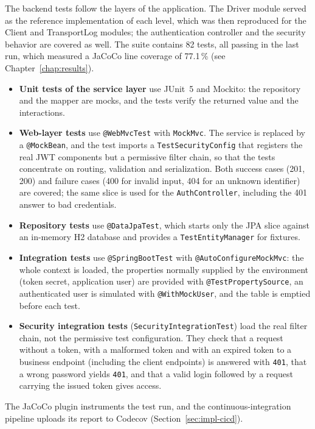 The backend tests follow the layers of the application. The Driver module served as the reference implementation of each level, which was then reproduced for the Client and TransportLog modules; the authentication controller and the security behavior are covered as well. The suite contains 82 tests, all passing in the last run, which measured a JaCoCo line coverage of 77.1\,\% (see Chapter~\ref{chap:results}).
\begin{itemize}
  \item \textbf{Unit tests of the service layer} use JUnit~5 and Mockito: the repository and the mapper are mocks, and the tests verify the returned value and the interactions.
  \item \textbf{Web-layer tests} use \texttt{@WebMvcTest} with \texttt{MockMvc}. The service is replaced by a \texttt{@MockBean}, and the test imports a \texttt{TestSecurityConfig} that registers the real JWT components but a permissive filter chain, so that the tests concentrate on routing, validation and serialization. Both success cases (201, 200) and failure cases (400 for invalid input, 404 for an unknown identifier) are covered; the same slice is used for the \texttt{AuthController}, including the 401 answer to bad credentials.
  \item \textbf{Repository tests} use \texttt{@DataJpaTest}, which starts only the JPA slice against an in-memory H2 database and provides a \texttt{TestEntityManager} for fixtures.
  \item \textbf{Integration tests} use \texttt{@SpringBootTest} with \texttt{@AutoConfigureMockMvc}: the whole context is loaded, the properties normally supplied by the environment (token secret, application user) are provided with \texttt{@TestPropertySource}, an authenticated user is simulated with \texttt{@WithMockUser}, and the table is emptied before each test.
  \item \textbf{Security integration tests} (\texttt{SecurityIntegrationTest}) load the real filter chain, not the permissive test configuration. They check that a request without a token, with a malformed token and with an expired token to a business endpoint (including the client endpoints) is answered with \texttt{401}, that a wrong password yields \texttt{401}, and that a valid login followed by a request carrying the issued token gives access.
\end{itemize}
The JaCoCo plugin instruments the test run, and the continuous-integration pipeline uploads its report to Codecov (Section~\ref{sec:impl-cicd}).



